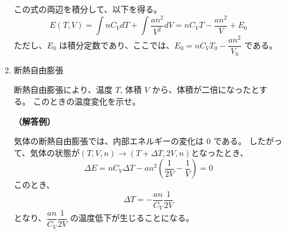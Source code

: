 \documentclass[uplatex,dvipdfmx,a4paper,11pt]{jsarticle}
\begin{document}
\begin{appendix}
\begin{enumerate}
\begin{enumerate}
この式の両辺を積分して、以下を得る。
\begin{equation*}
E(T,V) = \int n C_V dT + \int \dfrac{an^2}{V^2} dV = n C_V T - \dfrac{an^2}{V} + E_0
\end{equation*}
ただし、$E_0$ は積分定数であり、ここでは、$E_0 = n C_V T_0 - \dfrac{an^2}{V_0}$ である。

\item
断熱自由膨張

断熱自由膨張により、温度 $T$, 体積 $V$ から、体積が二倍になったとする。
このときの温度変化を示せ。

{\bf （解答例）}

気体の断熱自由膨張では、内部エネルギーの変化は 0 である。
したがって、気体の状態が$(T,V,n) \rightarrow (T+ \Delta T, 2V, n)$となったとき、
\begin{equation*}
\Delta E = n C_V \Delta T - an^2 \left(\dfrac{1}{2V} - \dfrac{1}{V} \right) = 0
\end{equation*}
このとき、
\begin{equation*}
\Delta T = -\dfrac{an}{C_V} \dfrac{1}{2V}
\end{equation*}
となり、$\dfrac{an}{C_V} \dfrac{1}{2V}$ の温度低下が生じることになる。

\end{enumerate}


\end{enumerate}

\end{appendix}
\end{document}
